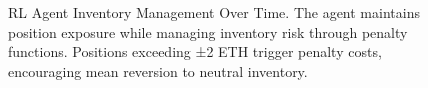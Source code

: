 \documentclass{article}
\begin{document}
\begin{figure}[h]
\caption{RL Agent Inventory Management Over Time. The agent maintains position exposure while managing inventory risk through penalty functions. Positions exceeding ±2 ETH trigger penalty costs, encouraging mean reversion to neutral inventory.}
\label{fig:inventory_management}
\end{figure}
\end{document}

